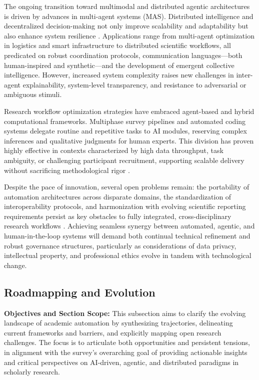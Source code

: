 \documentclass[sigconf]{acmart}
\begin{document}
The ongoing transition toward multimodal and distributed agentic architectures is driven by advances in multi-agent systems (MAS). Distributed intelligence and decentralized decision-making not only improve scalability and adaptability but also enhance system resilience \cite{ref21,ref22,ref25,ref26,ref40,ref49,ref101,ref102,ref111,ref112,ref113,ref114,ref115}. Applications range from multi-agent optimization in logistics and smart infrastructure to distributed scientific workflows, all predicated on robust coordination protocols, communication languages—both human-inspired and synthetic—and the development of emergent collective intelligence. However, increased system complexity raises new challenges in inter-agent explainability, system-level transparency, and resistance to adversarial or ambiguous stimuli.

Research workflow optimization strategies have embraced agent-based and hybrid computational frameworks. Multiphase survey pipelines and automated coding systems delegate routine and repetitive tasks to AI modules, reserving complex inferences and qualitative judgments for human experts. This division has proven highly effective in contexts characterized by high data throughput, task ambiguity, or challenging participant recruitment, supporting scalable delivery without sacrificing methodological rigor \cite{ref51,ref70,ref76,ref80,ref83,ref94,ref96}.

Despite the pace of innovation, several open problems remain: the portability of automation architectures across disparate domains, the standardization of interoperability protocols, and harmonization with evolving scientific reporting requirements persist as key obstacles to fully integrated, cross-disciplinary research workflows \cite{ref28,ref29,ref31,ref78,ref80}. Achieving seamless synergy between automated, agentic, and human-in-the-loop systems will demand both continual technical refinement and robust governance structures, particularly as considerations of data privacy, intellectual property, and professional ethics evolve in tandem with technological change.

\subsection{Roadmapping and Evolution}

\textbf{Objectives and Section Scope:} This subsection aims to clarify the evolving landscape of academic automation by synthesizing trajectories, delineating current frameworks and barriers, and explicitly mapping open research challenges. The focus is to articulate both opportunities and persistent tensions, in alignment with the survey's overarching goal of providing actionable insights and critical perspectives on AI-driven, agentic, and distributed paradigms in scholarly research.
\end{document}
